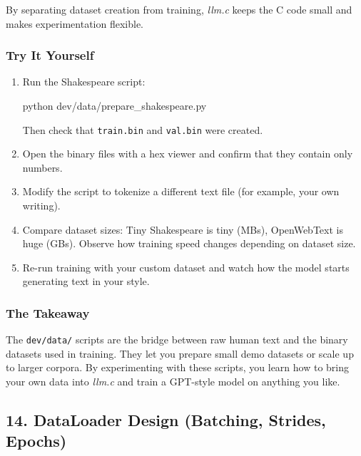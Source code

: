 \documentclass[
  letterpaper,
  DIV=11,
  numbers=noendperiod]{scrreprt}
\newenvironment{Shaded}{\begin{snugshade}}{\end{snugshade}}
\newcommand{\ExtensionTok}[1]{\textcolor[rgb]{0.00,0.23,0.31}{#1}}
\newcommand{\NormalTok}[1]{\textcolor[rgb]{0.00,0.23,0.31}{#1}}
\begin{document}
By separating dataset creation from training, \emph{llm.c} keeps the C
code small and makes experimentation flexible.

\subsubsection{Try It Yourself}\label{try-it-yourself-2}

\begin{enumerate}
\def\labelenumi{\arabic{enumi}.}
\item
  Run the Shakespeare script:

\begin{Shaded}
\begin{Highlighting}[]
\ExtensionTok{python}\NormalTok{ dev/data/prepare\_shakespeare.py}
\end{Highlighting}
\end{Shaded}

  Then check that \texttt{train.bin} and \texttt{val.bin} were created.
\item
  Open the binary files with a hex viewer and confirm that they contain
  only numbers.
\item
  Modify the script to tokenize a different text file (for example, your
  own writing).
\item
  Compare dataset sizes: Tiny Shakespeare is tiny (MBs), OpenWebText is
  huge (GBs). Observe how training speed changes depending on dataset
  size.
\item
  Re-run training with your custom dataset and watch how the model
  starts generating text in your style.
\end{enumerate}

\subsubsection{The Takeaway}\label{the-takeaway-2}

The \texttt{dev/data/} scripts are the bridge between raw human text and
the binary datasets used in training. They let you prepare small demo
datasets or scale up to larger corpora. By experimenting with these
scripts, you learn how to bring your own data into \emph{llm.c} and
train a GPT-style model on anything you like.

\subsection{14. DataLoader Design (Batching, Strides,
Epochs)}\label{dataloader-design-batching-strides-epochs}
\end{document}
